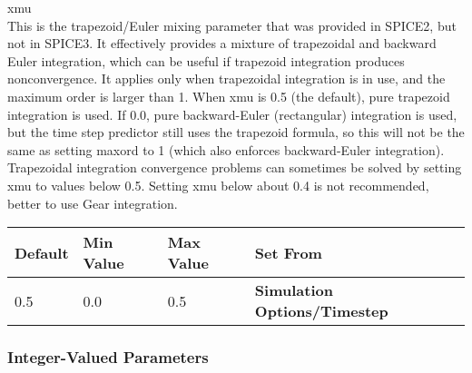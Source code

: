 \begin{description}
\item{\et xmu}\\
This is the trapezoid/Euler mixing parameter that was provided in
SPICE2, but not in SPICE3.  It effectively provides a mixture of
trapezoidal and backward Euler integration, which can be useful if
trapezoid integration produces nonconvergence.  It applies only when
trapezoidal integration is in use, and the maximum order is larger
than 1.  When {\et xmu} is 0.5 (the default), pure trapezoid
integration is used.  If 0.0, pure backward-Euler (rectangular)
integration is used, but the time step predictor still uses the
trapezoid formula, so this will not be the same as setting {\et
maxord} to 1 (which also enforces backward-Euler integration). 
Trapezoidal integration convergence problems can sometimes be solved
by setting {\et xmu} to values below 0.5.  Setting {\et xmu} below
about 0.4 is not recommended, better to use Gear integration.

\begin{tabular}{|l|l|l|l|}\hline
\bf Default & \bf Min Value & \bf Max Value & \bf Set From\\ \hline
0.5 & 0.0 & 0.5 & \bf Simulation Options/Timestep\\ \hline
\end{tabular}
\end{description}

\subsubsection{Integer-Valued Parameters}

